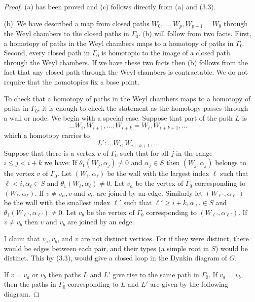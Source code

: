 \documentclass{memo-l}
\theoremstyle{definition}
\theoremstyle{remark}
\numberwithin{section}{chapter}
\numberwithin{equation}{chapter}
\begin{document}
\begin{proof}  (a) has been proved and (c) follows directly from
(a) and (3.3).

   (b)\ We have described a map from closed paths $W_{0},\ldots
,W_{p},W_{p+1} = W_{0}$ through the Weyl chambers to the closed paths in
${\Gamma}_{0}$.  (b) will follow from two facts.  First, a homotopy of
paths in the Weyl chambers maps to a homotopy of paths in ${\Gamma}_{0}$.
Second, every closed path in ${\Gamma}_{0}$ is homotopic to the image of a
closed path through the Weyl chambers.  If we have these two facts then
(b) follows from the fact that any closed path through the Weyl chambers
is contractable.  We do not require that the homotopies fix a base point.

   To check that a homotopy of paths in the Weyl chambers maps to a
homotopy of paths in ${\Gamma}_{0}$, it is enough to check the statement as
the homotopy passes through a wall or node.  We begin with a special case.
Suppose that part of the path $L$ is
$$
\ldots W_{i},W_{i+1},\ldots ,W_{i+k}=W_{i},W_{i+k+1},\ldots
$$
which a homotopy carries to
$$
L':  \ldots W_{i},W_{i+k+1},\ldots
$$
Suppose that there is a vertex $v$ of ${\Gamma}_{0}$ such that for all $j$
in the range $i \le j < i+k$ we have: If
${\theta}_{1}(W_{j},{\alpha}_{j})\ne 0$ and ${\alpha}_{j}  \in  S$ then
$(W_{j},{\alpha}_{j})$ belongs to the vertex $v$ of ${\Gamma}_{0}$.  Let
$(W_{\ell},{\alpha}_{{\ell}})$ be the wall with the largest index
${\ell}$ such that ${\ell} < i, {\alpha}_{{\ell}}  \in  S$ and
${\theta}_{1}(W_{{\ell}},{\alpha}_{{\ell}}) \ne 0$.  Let $v_{a}$ be the
vertex of ${\Gamma}_{0}$ corresponding to $(W_{{\ell}},{\alpha}_{{\ell}})$.
If $v \ne v_{{\alpha}}, v$ and $v_{{\alpha}}$ are joined by an edge.
Similarly let $(W_{{\ell}'},{\alpha}_{{\ell}'})$ be the wall with the
smallest index ${\ell}'$ such that ${\ell}' \ge i+k, {\alpha}_{{\ell}'}
 \in  S$ and ${\theta}_{1}(W_{{\ell}'},{\alpha}_{{\ell}'}) \ne 0$.  Let
$v_{b}$ be the vertex of ${\Gamma}_{0}$ corresponding to
$(W_{{\ell}'},{\alpha}_{{\ell}'})$.  If $v \ne v_{b}$ then $v$ and $v_{b}$
are joined by an edge.


   I claim that $v_{a}, v_{b}$, and $v$ are not distinct vertices.  For if
they were distinct, there would be edges between each pair, and their types
(a simple root in $S$) would be distinct.  This by (3.3), would give a
closed loop in the Dynkin diagram of $G$.

   If $v = v_{a}$ or $v_{b}$ then paths $L$ and $L'$ give rise to the same
path in ${\Gamma}_{0}$.  If $v_{a} = v_{b}$, then the paths in
${\Gamma}_{0}$ corresponding to $L$ and $L'$ are given by the following
diagram.


\end{proof}
\end{document}

